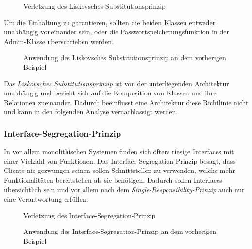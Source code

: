 \documentclass[conference]{IEEEtran}
\begin{document}

\begin{figure}[htbp]
	\small
	
	\caption{Verletzung des Liskovsches Substitutionsprinzip}
	\label{VorLSP}
\end{figure}

Um die Einhaltung zu garantieren, sollten die beiden Klassen entweder unabhängig voneinander sein, oder die Passwortspeicherungsfunktion in der Admin-Klasse überschrieben werden. 
 
\begin{figure}[htbp]
	\small
	
	\caption{Anwendung des Liskovsches Substitutionsprinzip an dem vorherigen Beispiel}
	\label{NachLSP}
\end{figure}
 
Das \emph{Liskovsches Substitutionsprinzip} ist von der unterliegenden Architektur unabhängig und bezieht sich auf die Komposition von Klassen und ihre Relationen zueinander. Dadurch beeinflusst eine Architektur diese Richtlinie nicht und kann in den folgenden Analyse vernachlässigt werden. %



\subsubsection{Interface-Segregation-Prinzip} In vor allem monolithischen Systemen finden sich öfters riesige Interfaces mit einer Vielzahl von Funktionen. Das Interface-Segregation-Prinzip besagt, dass Clients nie gezwungen seinen sollen Schnittstellen zu verwenden, welche mehr Funktionalitäten bereitstellen als sie benötigen. Dadurch sollen Interfaces übersichtlich sein und vor allem nach dem \emph{Single-Responsibility-Prinzip} auch nur eine Verantwortung erfüllen.

\begin{figure}[htbp]
	\small
	
	\caption{Verletzung des Interface-Segregation-Prinzip}
	\label{VorISP}
\end{figure}


\begin{figure}[htbp]
	\small
	
	\caption{Anwendung des Interface-Segregation-Prinzip an dem vorherigen Beispiel} %
	\label{NachISP}
\end{figure}
\end{document}
